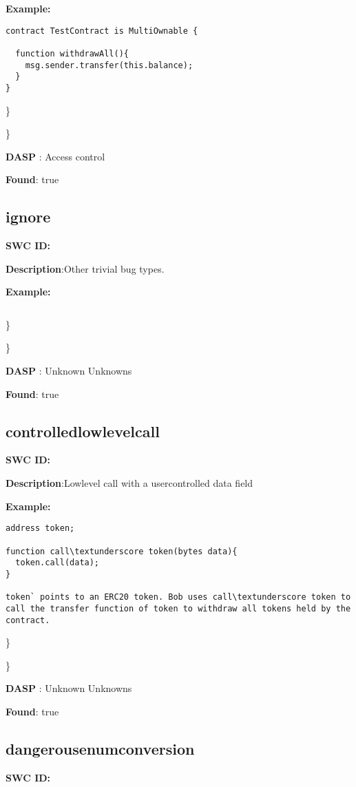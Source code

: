 \documentclass{article}
\begin{document}
\textbf{Example:} 
\begin{verbatim}
contract TestContract is MultiOwnable {

  function withdrawAll(){
    msg.sender.transfer(this.balance);
  }
}

\end{verbatim}\} 

\} 

\textbf{DASP} : Access control

\textbf{Found}: true

\subsection{ignore} 
\textbf{SWC \textunderscore ID:} 

\textbf{Description}:Other trivial bug types.


\textbf{Example:} 
\begin{verbatim}

\end{verbatim}\} 

\} 

\textbf{DASP} : Unknown Unknowns

\textbf{Found}: true

\subsection{controlled\textunderscore lowlevel\textunderscore call} 
\textbf{SWC \textunderscore ID:} 

\textbf{Description}:Low\textendash level call with a user\textendash controlled data field


\textbf{Example:} 
\begin{verbatim}
address token;

function call\textunderscore token(bytes data){
  token.call(data);
}

token` points to an ERC20 token. Bob uses call\textunderscore token to call the transfer function of token to withdraw all tokens held by the contract.

\end{verbatim}\} 

\} 

\textbf{DASP} : Unknown Unknowns

\textbf{Found}: true

\subsection{dangerous\textunderscore enum\textunderscore conversion} 
\textbf{SWC \textunderscore ID:} 
\end{document}
